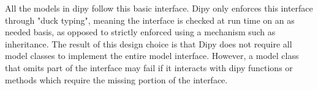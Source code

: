 All the models in dipy follow this basic interface. Dipy only enforces this interface through "duck typing", meaning the interface is checked at run time on an as needed basis, as opposed to strictly enforced using a mechanism such as inheritance. The result of this design choice is that Dipy does not require all model classes to implement the entire model interface. However, a model class that omits part of the interface may fail if it interacts with dipy functions or methods which require the missing portion of the interface.
